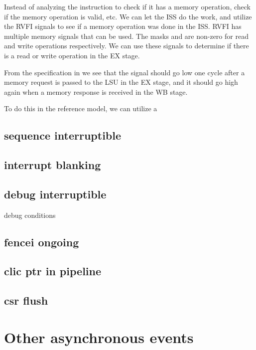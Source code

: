 Instead of analyzing the instruction to check if it has a memory operation, check if the memory operation is valid, etc. We can let the ISS do the work, and utilize the RVFI signals to see if a memory operation was done in the ISS. RVFI has multiple memory signals that can be used. The masks  and  are non-zero for read and write operations respectively. We can use these signals to determine if there is a read or write operation in the EX stage.

From the specification in  we see that the  signal should go low one cycle after a memory request is passed to the LSU in the EX stage, and it should go high again when a memory response is received in the WB stage. 

To do this in the reference model, we can utilize a  



\subsection{sequence interruptible}

\subsection{interrupt blanking}



\subsection{debug interruptible}
debug conditions
\subsection{fencei ongoing}
\subsection{clic ptr in pipeline}
\subsection{csr flush }
\subsection{}
\subsection{}






\section{Other asynchronous events}



